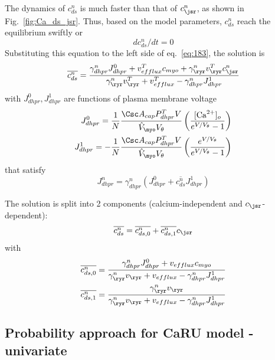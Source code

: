 The dynamics of $c^n_{ds}$ is much faster than that of $c^n_\jsr$, as
shown in Fig.~\ref{fig:Ca_ds_jsr}. Thus, based on the model
parameters, $c^n_{ds}$ reach the equilibrium swiftly or
\begin{equation}
  \label{eq:210}
  dc^n_{ds}/dt  = 0
\end{equation}
Substituting this equation to the left side of eq.~\eqref{eq:183}, the
solution is
\begin{equation}
  \label{eq:220}
  \overline{c^n_{ds}} =
  \frac{\gamma^n_{dhpr}J^0_{dhpr}+v^T_{efflux}c_{myo}+\gamma^n_\ryr v^T_\ryr
    c^n_\jsr}{\gamma^n_\ryr v^T_\ryr + v^T_{efflux}
    - \gamma^n_{dhpr}J^1_{dhpr}}
\end{equation}
with $J^0_{dhpr}, J^1_{dhpr}$ are functions of plasma membrane voltage
\begin{equation}
  \label{eq:221}
  \begin{split}
    J^0_{dhpr} = \frac{1}{N} \frac{\Csc
      A_{cap}P^T_{dhpr}V}{\hat{V}_\myo V_\theta} \left( \frac{[\Ca]_o}{e^{V/V_\theta}-1}  \right)\\
    J^1_{dhpr} =  -\frac{1}{N} \frac{\Csc
      A_{cap}P^T_{dhpr}V}{\hat{V}_\myo V_\theta} \left( \frac{e^{V/V_\theta}}{e^{V/V_\theta}-1}  \right)
  \end{split}
\end{equation}
that satisfy
\begin{equation}
  \label{eq:2082}
  J^n_{dhpr} =   \gamma^n_{dhpr} (J^0_{dhpr} + \overline{c^n_{ds}}  J^1_{dhpr})
\end{equation}

The solution is split into 2 components (calcium-independent and
$c_\jsr$-dependent):
\begin{equation}
  \label{eq:2051}
  \overline{c^n_{ds}} =   \overline{c^n_{ds,0}} +  \overline{c^n_{ds,1}}  c_\jsr
\end{equation}
with
\begin{equation}
  \label{eq:2061}
  \begin{split}
    \overline{c^n_{ds,0}} &= \frac{\gamma^n_{dhpr}J^0_{dhpr} +
      v_{efflux}c_{myo}}{\gamma^n_\ryr v_\ryr + v_{efflux} - \gamma^n_{dhpr}J^1_{dhpr}} \\
    \overline{c^n_{ds,1}} &=
    \frac{\gamma^n_\ryr v_\ryr}{\gamma^n_\ryr v_\ryr + v_{efflux}
      - \gamma^n_{dhpr}J^1_{dhpr}} \\
  \end{split}
\end{equation}


\subsection{Probability approach for CaRU model - univariate}
\label{sec:prob-appr-caru}

